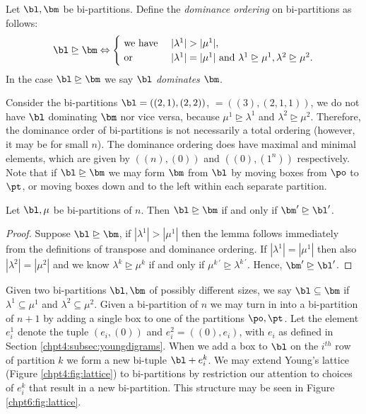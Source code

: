 \documentclass[11pt]{report}
\begin{document}
\begin{defn}
	\label{chpt6:def:bidom}
	Let $\bl, \bm$ be bi-partitions.
	Define the \emph{dominance ordering} on bi-partitions as follows: 
	\[\bl \trianglerighteq \bm
	\Leftrightarrow \begin{cases} \text{ we have } & |\lambda^{1}| > 
	|\mu^{1}|,\\ 
	\text{ or } & |\lambda^{1}| = 
	|\mu^{1}|  \text{ and } \lambda^{1}
	\trianglerighteq \mu^{1}, \lambda^{2} \trianglerighteq 
	\mu^{2}.
	\end{cases} 
	\]
	In the case $\bl \trianglerighteq \bm$ we say $\bl$ \emph{dominates} $\bm$. 
\end{defn}
Consider the bi-partitions $\bl = ((2,1),(2,2))$, $\bm = ((3),(2,1,1))$, we do not have $\bl$ dominating $\bm$ nor vice versa, because $\mu^{1} \trianglerighteq \lambda^{1}$ and $\lambda^{2} \trianglerighteq \mu^{2}$. Therefore, the dominance order of bi-partitions is not necessarily a total ordering (however, it may be for small $n$). The dominance ordering does have maximal and minimal elements, which are given by $((n),(0))$ and $((0),(1^{n}))$ respectively.   
Note that if $\bl \trianglerighteq \bm$ we may form $\bm$ from $\bl$ by moving boxes from $\po$ to $\pt$, or moving boxes down and to the left within each separate partition. 

\begin{lemma}
	Let $\bl, \mu$ be bi-partitions of $n$. Then $\bl \trianglerighteq \bm$ if and only if $\bm^{\prime} \trianglerighteq \bl^{\prime}$. 
\end{lemma}
\begin{proof}
	Suppose $\bl \trianglerighteq \bm$, if $|\lambda^{1}| > |\mu^{1}|$ then the lemma follows immediately from the definitions of transpose and dominance ordering. If $|\lambda^{1}| = |\mu^{1}|$ then  also $|\lambda^{2}| = |\mu^{2}|$ and we know $\lambda^{k} \trianglerighteq \mu^{k}$ if and only if $\mu^{k \, \prime} \trianglerighteq \lambda^{k \, \prime}$. Hence, $\bm^{\prime} \trianglerighteq \bl^{\prime}$. 
\end{proof}


Given two bi-partitions $\bl, \bm$ of possibly different sizes, we say $ \bl \subseteq \bm$ if $\lambda^{1} \subseteq \mu^{1}$ and $\lambda^{2} \subseteq \mu^{2}$. 
Given a bi-partition of $n$ we may turn in into a bi-partition of $n+1$ by adding a single box to one of the partitions $\po,\pt$. Let the element $e^{1}_{i}$ denote the tuple $(e_{i},(0))$ and $e_{i}^{2} = ((0),e_{i})$, with $e_{i}$ as defined in Section \ref{chpt4:subsec:youngdigrams}. When we add a box to $\bl$ on the $i^{th}$ row of partition $k$ we form a new bi-tuple $\bl + e_{i}^{k}$. We may extend Young's lattice (Figure \ref{chpt4:fig:lattice}) to bi-partitions by restriction our attention to choices of $e_{i}^{k}$ that result in a new bi-partition. This structure may be seen in Figure \ref{chpt6:fig:lattice}.
\end{document}
